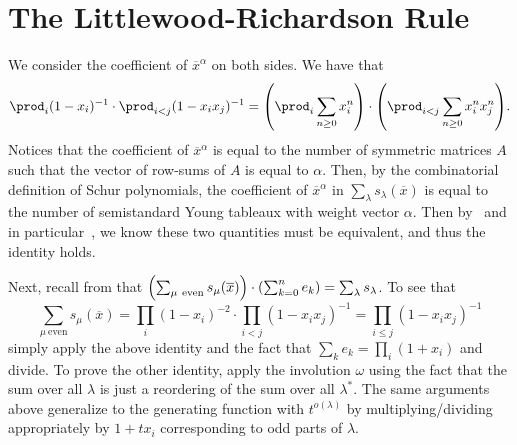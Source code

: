 \documentclass[letterpaper, 11pt, oneside]{book}
\begin{document}
\clearpage

\section{The Littlewood-Richardson Rule}

\begin{sol}\label{ex:Manivel_1.5.4}
  We consider the coefficient of $\overline{x}^{\alpha}$ on both sides.
  We have that
  \[
    \prod_{i} (1 - x_{i})^{-1} \cdot \prod_{i < j} (1 - x_{i}x_{j})^{-1} = \pqty{\prod_{i} \sum_{n \geq 0} x_{i}^{n}} \cdot \pqty{\prod_{i < j} \sum_{n \geq 0} x_{i}^{n}x_{j}^{n}}.
  \]
  Notices that the coefficient of $\overline{x}^{\alpha}$ is equal to the number of symmetric matrices $A$ such that the vector of row-sums of $A$ is equal to $\alpha$.
  Then, by the combinatorial definition of Schur polynomials, the coefficient of $\overline{x}^{\alpha}$ in $\sum_{\lambda} s_{\lambda}(\overline{x})$ is equal to the number of semistandard Young tableaux with weight vector $\alpha$.
  Then by~\cite[Knuth Correspondence 1.3.4]{book:Manivel} and in particular~\cite[Corollary 1.5.3]{book:Manivel}, we know these two quantities must be equivalent, and thus the identity holds.

  Next, recall from  that $\pqty{\sum_{\mu\ \text{even}} s_{\mu}(\overline{x})} \cdot \pqty{\sum_{k = 0}^{n} e_{k}} = \sum_{\lambda} s_{\lambda}$.
  To see that
  \[
    \sum_{\mu\ \text{even}} s_{\mu}(\overline{x}) = \prod_{i} (1 - x_{i})^{-2} \cdot \prod_{i < j} (1 - x_{i}x_{j})^{-1} = \prod_{i \leq j} (1 - x_{i}x_{j})^{-1}
  \]
  simply apply the above identity and the fact that $\sum_{k} e_{k} = \prod_{i} (1 + x_{i})$ and divide.
  To prove the other identity, apply the involution $\omega$ using the fact that the sum over all $\lambda$ is just a reordering of the sum over all $\lambda^{*}$.
  The same arguments above generalize to the generating function with $t^{o(\lambda)}$ by multiplying/dividing appropriately by $1 + tx_{i}$ corresponding to odd parts of $\lambda$.
\end{sol}

\printbibliography
\end{document}
